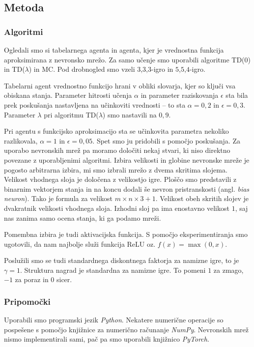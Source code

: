 \documentclass[12pt,a4paper]{amsart}
\theoremstyle{definition} %
\theoremstyle{plain} %
\begin{document}
\subsection{Metoda}

\subsubsection{Algoritmi}
Ogledali smo si tabelarnega agenta in agenta, kjer je vrednostna funkcija aproksimirana z nevronsko mrežo. 
Za samo učenje smo uporabili algoritme TD($0$) in TD($\lambda$) in MC. Pod drobnogled smo vzeli 
$3$,$3$,$3$-igro in $5$,$5$,$4$-igro. %

Tabelarni agent vrednostno funkcijo hrani v obliki slovarja, kjer so ključi vsa obiskana stanja. 
Parameter hitrosti učenja $\alpha$ in parameter raziskovanja $\epsilon$ sta bila prek poskušanja 
nastavljena na učinkoviti vrednosti -- to sta $\alpha = 0,2$ in $\epsilon = 0,3$. Parameter $\lambda$
pri algoritmu TD($\lambda$) smo nastavili na $0,9$.

Pri agentu s funkcijsko aproksimacijo sta se učinkovita parametra nekoliko razlikovala, $\alpha = 1$ 
in $\epsilon = 0,05$. Spet smo ju pridobili s pomočjo poskušanja. Za uporabo nevronskih mrež pa moramo 
določiti nekaj stvari, ki niso direktno povezane z uporabljenimi algoritmi. Izbira velikosti in globine 
nevronske mreže je pogosto arbitrarna izbira, mi smo izbrali mrežo z dvema skritima slojema. Velikost 
vhodnega sloja je določena z velikostjo igre. Ploščo smo predstavili z binarnim vektorjem stanja in na 
koncu dodali še nevron pristranskosti (angl. \textit{bias neuron}). Tako je formula za velikost 
$ m \times n \times 3 + 1$. Velikost obeh skritih slojev je dvakratnik velikosti vhodnega sloja. Izhodni 
sloj pa ima enostavno velikost $1$, saj nas zanima samo ocena stanja, ki ga podamo mreži. 

Pomembna izbira je tudi aktivacijska funkcija. S pomočjo eksperimentiranja smo ugotovili, da nam 
najbolje služi funkcija ReLU oz. $f(x) = \max(0, x)$.

Poslužili smo se tudi standardnega diskontnega faktorja za namizne igre, to je $\gamma = 1$. Struktura 
nagrad je standardna za namizne igre. To pomeni $1$ za zmago, $-1$ za poraz in $0$ sicer.

\subsubsection{Pripomočki}
Uporabili smo programski jezik \textit{Python}. Nekatere numerične operacije so pospešene s pomočjo 
knjižnice za numerično računanje \textit{NumPy}. Nevronskih mrež nismo implementirali sami, pač pa 
smo uporabili knjižnico \textit{PyTorch}.
\end{document}
